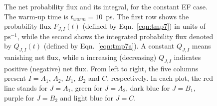 \documentclass[a4paper,preprint,unsortedaddress,onecolumn]{revtex4-1}
\begin{document}
\begin{figure}
  \caption{
    The net probability flux and its integral, for the constant EF case.
    The warm-up time is $t_{warm} = 10$~ps.
    The first row shows the probability flux $F_{J,I}(t)$ (defined by Eqn.~\eqref{eqn:tmp7}) in units of $\textrm{ps}^{-1}$, while the second
    shows the integrated  probability flux denoted by $Q_{J,I}(t)$ (defined by Eqn.~\eqref{eqn:tmp7a}).
    A constant $Q_{J,I}$ means vanishing net flux, while a increasing (decreasing)
    $Q_{J,I}$ indicates positive (negative) net flux.
    From left to right, the five
    columns present $I = A_1$, $A_2$, $B_1$, $B_2$ and
    $C$, respectively. In each plot, the red line stands for $J=A_1$,
    green for $J=A_2$, dark blue for $J=B_1$, purple for $J=B_2$ and light blue
    for $J=C$. 
    }
  \label{fig:tmp6}
\end{figure}

\end{document}
